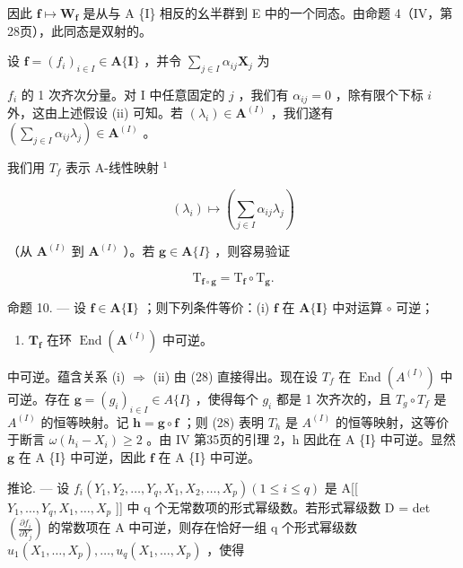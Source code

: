 因此 \(\mathbf{f} \mapsto \mathbf{W}_{\mathbf{f}}\) 是从与 A \{I\} 相反的幺半群到 E 中的一个同态。由命题 4（IV，第28页），此同态是双射的。

设 \(\mathbf{f} = (f_i)_{i\in I}\in \mathbf{A}\{\mathbf{I}\}\) ，并令 \(\sum_{j\in I}\alpha_{ij}\mathbf{X}_j\) 为

\(f_{i}\) 的 1 次齐次分量。对 I 中任意固定的 \(j\) ，我们有 \(\alpha_{ij} = 0\) ，除有限个下标 \(i\) 外，这由上述假设 (ii) 可知。若 \((\lambda_i) \in \mathbf{A}^{(I)}\) ，我们遂有 \(\left(\sum_{j \in I} \alpha_{ij} \lambda_j\right) \in \mathbf{A}^{(I)}\) 。

我们用 \(T_{f}\) 表示 A-线性映射 \(^{1}\)

\[
\left(\lambda_ {i}\right) \mapsto \left(\sum_ {j \in I} \alpha_ {i j} \lambda_ {j}\right)
\]

（从 \(\mathbf{A}^{(I)}\) 到 \(\mathbf{A}^{(I)}\) ）。若 \(\mathbf{g} \in \mathbf{A}\{I\}\) ，则容易验证

\[
\mathrm{T} _ {\mathbf {f} \circ \mathbf {g}} = \mathrm{T} _ {\mathbf {f}} \circ \mathrm{T} _ {\mathbf {g}}.\tag{28}
\]

命题 10. --- 设 \(\mathbf{f} \in \mathbf{A}\{\mathbf{I}\}\) ；则下列条件等价：(i) \(\mathbf{f}\) 在 \(\mathbf{A}\{\mathbf{I}\}\) 中对运算 \(\circ\) 可逆；

\begin{enumerate}
\def\labelenumi{(\roman{enumi})}
\setcounter{enumi}{1}
\tightlist
\item
  \(\mathbf{T}_{\mathbf{f}}\) 在环 \(\operatorname{End}(\mathbf{A}^{(I)})\) 中可逆。
\end{enumerate}

中可逆。蕴含关系 (i) \(\Rightarrow\) (ii) 由 (28) 直接得出。现在设 \(T_{f}\) 在 \(\operatorname{End}(A^{(I)})\) 中可逆。存在 \(\mathbf{g} = (g_i)_{i \in I} \in A\{I\}\) ，使得每个 \(g_i\) 都是 1 次齐次的，且 \(T_{g} \circ T_{f}\) 是 \(A^{(I)}\) 的恒等映射。记 \(\mathbf{h} = \mathbf{g} \circ \mathbf{f}\) ；则 (28) 表明 \(T_{h}\) 是 \(A^{(I)}\) 的恒等映射，这等价于断言 \(\omega(h_i - X_i) \geqslant 2\) 。由 IV 第35页的引理 2，h 因此在 A \{I\} 中可逆。显然 \(\mathbf{g}\) 在 A \{I\} 中可逆，因此 \(\mathbf{f}\) 在 A \{I\} 中可逆。

推论. --- 设 \(f_{i}(Y_{1}, Y_{2}, \ldots, Y_{q}, X_{1}, X_{2}, \ldots, X_{p}) (1 \leqslant i \leqslant q)\) 是 A{[}{[} \(Y_{1}, \ldots, Y_{q}, X_{1}, \ldots, X_{p}\) {]}{]} 中 q 个无常数项的形式幂级数。若形式幂级数 D = det \(\left(\frac{\partial f_{i}}{\partial Y_{j}}\right)\) 的常数项在 A 中可逆，则存在恰好一组 q 个形式幂级数 \(u_{1}(X_{1}, \ldots, X_{p}), \ldots, u_{q}(X_{1}, \ldots, X_{p})\) ，使得

